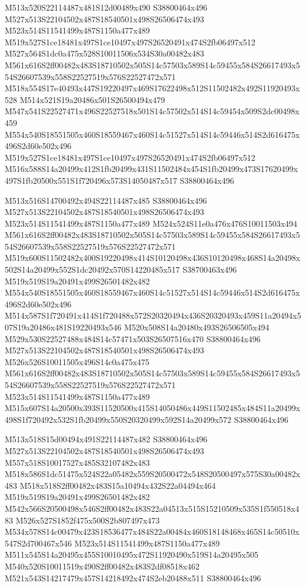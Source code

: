 \documentclass{article}
\begin{document}
\begin{multicols}{2}
M513x520S22114487x481S12d00489x490 S38800464x496 M527x513S22104502x487S18540501x498S26506474x493 M523x514S11541499x487S1150a477x489 M519x527S1ce18481x497S1ce10497x497S26520491x474S2fb06497x512 M527x564S1dc0a475x528S10011506x534S30a00482x483 M561x616S2ff00482x483S18710502x505S14c57503x589S14c59455x584S26617493x554S26607539x558S22527519x576S22527472x571 M518x554S17e40493x447S19220497x469S17622498x512S11502482x492S11920493x528 M514x521S19a20486x501S26500494x479 M547x541S22527471x496S22527518x501S14c57502x514S14c59454x509S2dc00498x459 M554x540S18551505x460S18559467x460S14c51527x514S14c59446x514S2d616475x496S2d60e502x496 M519x527S1ce18481x497S1ce10497x497S26520491x474S2fb06497x512 M516x588S14a20499x412S1fb20499x431S11502484x454S1fb20499x473S17620499x497S1fb20500x551S1f720496x573S14050487x517 S38800464x496

M513x516S14700492x494S22114487x485 S38800464x496 M527x513S22104502x487S18540501x498S26506474x493 M523x514S11541499x487S1150a477x489 M524x524S11e0a476x476S10011503x494 M561x616S2ff00482x483S18710502x505S14c57503x589S14c59455x584S26617493x554S26607539x558S22527519x576S22527472x571 M519x600S11502482x400S19220498x414S10120498x436S10120498x468S14a20498x502S14a20499x552S1dc20492x570S14220485x517 S38700463x496 M519x519S19a20491x499S26501482x482 M554x540S18551505x460S18559467x460S14c51527x514S14c59446x514S2d616475x496S2d60e502x496 M514x587S1f720491x414S1f720488x572S20320494x436S20320493x459S11a20494x507S19a20486x481S19220493x546 M520x508S14a20480x493S26506505x494 M529x530S22527488x484S14c57471x503S26507516x470 S38800464x496 M527x513S22104502x487S18540501x498S26506474x493 M526x526S10011505x496S14c0a475x475 M561x616S2ff00482x483S18710502x505S14c57503x589S14c59455x584S26617493x554S26607539x558S22527519x576S22527472x571 M523x514S11541499x487S1150a477x489 M515x607S14a20500x393S11520500x415S14050486x449S11502485x484S11a20499x498S1f720492x532S1fb20499x550S20320499x592S14a20499x572 S38800464x496

M513x518S15d00494x491S22114487x482 S38800464x496 M527x513S22104502x487S18540501x498S26506474x493 M557x518S10017527x485S32107482x483 M518x586S1dc51475x524S22a05482x559S20500472x548S20500497x575S30a00482x483 M518x518S2ff00482x483S15a10494x432S22a04494x464 M519x519S19a20491x499S26501482x482 M542x566S20500498x546S2ff00482x483S22a04513x515S15210509x535S1f550518x483 M526x527S1852f475x500S2b807497x473 M534x578S14c00479x423S18536477x484S22a00484x460S18148468x465S14c50510x547S2d700467x546 M523x514S11541499x487S1150a477x489 M511x545S14a20495x455S10010495x472S11920490x519S14a20495x505 M540x520S10011519x490S2ff00482x483S2df08518x462 M521x543S14217479x457S14218492x474S2eb20488x511 S38800464x496


\end{multicols}
\end{document}
